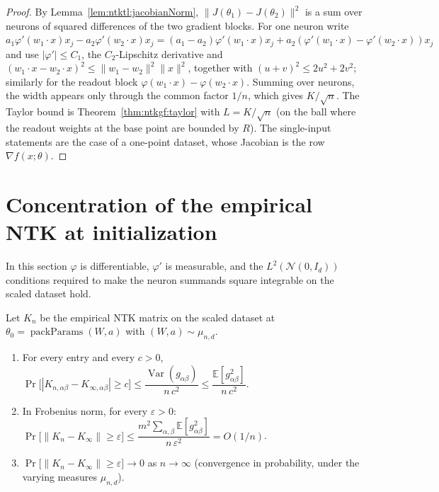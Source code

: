 \begin{proof}
  \leanok
By Lemma~\ref{lem:ntktl:jacobianNorm}, $\|J(\theta_1)-J(\theta_2)\|^2$ is a sum over neurons of squared differences of the two gradient blocks. For one neuron write
$a_{1}\varphi'(w_1\cdot x)x_j-a_2\varphi'(w_2\cdot x)x_j=(a_1-a_2)\varphi'(w_1\cdot x)x_j+a_2(\varphi'(w_1\cdot x)-\varphi'(w_2\cdot x))x_j$ and use $|\varphi'|\le C_1$, the $C_2$-Lipschitz derivative and
$(w_1\cdot x-w_2\cdot x)^2\le\|w_1-w_2\|^2\|x\|^2$, together with $(u+v)^2\le2u^2+2v^2$; similarly for the readout block $\varphi(w_1\cdot x)-\varphi(w_2\cdot x)$. Summing over neurons, the width appears only through the common factor $1/n$, which gives $K/\sqrt n$. The Taylor bound is
Theorem~\ref{thm:ntkgf:taylor} with $L=K/\sqrt n$ (on the ball where the readout weights at the base point are bounded by $R$). The single-input statements are the case of a one-point dataset, whose Jacobian is the row $\nabla f(x;\theta)$.
\end{proof}


\section{Concentration of the empirical NTK at initialization}\label{sec:ntktl:ntkConcentration}

In this section $\varphi$ is differentiable, $\varphi'$ is measurable, and the $L^2(\mathcal N(0,I_d))$ conditions required to make the neuron summands square integrable on the scaled dataset hold.

\begin{theorem}\label{thm:ntktl:ntkChebyshev}
  \leanok
Let $K_n$ be the empirical NTK matrix on the scaled dataset at $\theta_0=\operatorname{packParams}(W,a)$ with $(W,a)\sim\mu_{n,d}$.
\begin{enumerate}
  \item For every entry and every $c>0$, $\Pr\bigl[|K_{n,\alpha\beta}-K_{\infty,\alpha\beta}|\ge c\bigr]\le\dfrac{\operatorname{Var}(g_{\alpha\beta})}{n\,c^2}\le\dfrac{\mathbb E[g_{\alpha\beta}^2]}{n\,c^2}$.
  \item In Frobenius norm, for every $\varepsilon>0$: $\Pr\bigl[\|K_n-K_\infty\|\ge\varepsilon\bigr]\le\dfrac{m^2\sum_{\alpha,\beta}\mathbb E[g_{\alpha\beta}^2]}{n\,\varepsilon^2}=O(1/n)$.
  \item $\Pr\bigl[\|K_n-K_\infty\|\ge\varepsilon\bigr]\to0$ as $n\to\infty$ (convergence in probability, under the varying measures $\mu_{n,d}$).
\end{enumerate}
\end{theorem}

